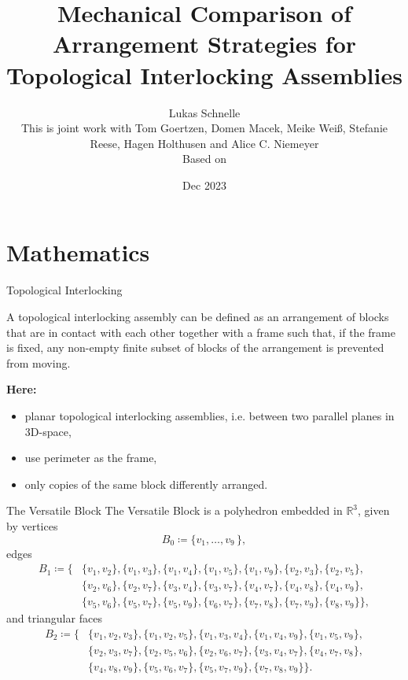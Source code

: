 \documentclass{beamer}
\title{Mechanical Comparison of Arrangement Strategies for Topological Interlocking Assemblies}
\author{Lukas Schnelle \\
This is joint work with Tom Goertzen, Domen Macek, Meike Weiß, Stefanie Reese, Hagen Holthusen and Alice C. Niemeyer \\
Based on \cite{assemblies2023}}
\date{Dec 2023}
\numberwithin{equation}{aufgabe}
\newcommand\R{\mathbb R}
\begin{document}
\maketitle

\section{Mathematics}
\begin{frame}{Topological Interlocking}
    \begin{definition}
        A topological interlocking assembly can be defined as an arrangement of blocks that are in contact with each other together with a frame such that, if the frame is fixed, any non-empty finite subset of blocks of the arrangement is prevented from moving.
    \end{definition}
    \pause
    \textbf{Here:} 
    \begin{itemize}
        \item planar topological interlocking assemblies, i.e. between two parallel planes in 3D-space,
        \pause\item use perimeter as the frame,
        \pause\item only copies of the same block differently arranged.
    \end{itemize}  
\end{frame}
\begin{frame}{The Versatile Block}
    The Versatile Block is a polyhedron embedded in $\R^3$, given by \pause vertices 
    $$B_0 \coloneqq \{v_1,\ldots,v_9 \, \},$$ \pause
    edges
    \begin{align*}
        B_1 \coloneqq \{  &\{ v_1, v_2 \},  \{ v_1, v_3 \},  \{ v_1, v_4 \}, \{ v_1, v_5 \}, \{ v_1, v_9 \},  \{ v_2, v_3 \}, \{ v_2, v_5 \}, \\
        & \{ v_2, v_6 \},  \{ v_2, v_7 \},  \{ v_3, v_4 \},  \{ v_3, v_7 \},  \{ v_4, v_7 \}, \{ v_4, v_8 \}, \{ v_4, v_9 \},\\
        & \{ v_5, v_6 \}, \{ v_5, v_7 \},  \{ v_5, v_9 \}, \{ v_6, v_7 \},  \{ v_7, v_8 \},  \{ v_7, v_9 \},  \{ v_8, v_9 \}  \},
    \end{align*} \pause
    and triangular faces
    \begin{align*}
        B_2 \coloneqq \{& \{v_1, v_2, v_3\}, \{v_1, v_2, v_5\},  \{v_1, v_3, v_4\}, \{v_1, v_4, v_9\}, \{v_1, v_5, v_9\}, \\
        &\{v_2, v_3, v_7\},  \{v_2, v_5, v_6\},\{v_2, v_6, v_7\},  \{v_3, v_4, v_7\},  \{v_4, v_7, v_8\},  \\
        &\{v_4, v_8, v_9\},  \{v_5, v_6, v_7\},  \{v_5, v_7, v_9\}, \{v_7, v_8, v_9\}\}.
    \end{align*}
\end{frame}
\end{document}
